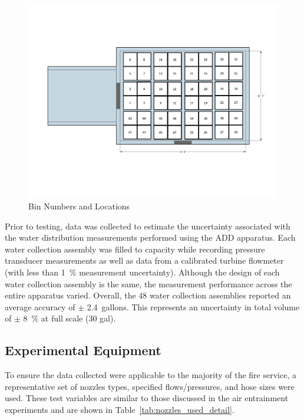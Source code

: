 \documentclass{book}
\begin{document}
\begin{figure}[!ht]
	\centering
	\includegraphics[width=\columnwidth]{Figures/Water_Distribution/Bin_Numbers_NoDimensions}
	\caption{Bin Numbers and Locations}
	\label{fig:Bin Numbers and Locations}
\end{figure}

Prior to testing, data was collected to estimate the uncertainty associated with the water distribution measurements performed using the ADD apparatus. Each water collection assembly was filled to capacity while recording pressure transducer measurements as well as data from a calibrated turbine flowmeter (with less than 1~\% measurement uncertainty). Although the design of each water collection assembly is the same, the measurement performance across the entire apparatus varied. Overall, the 48 water collection assemblies reported an average accuracy of $\pm$ 2.4~gallons. This represents an uncertainty in total volume of $\pm$ 8~\% at full scale (30 gal).

\subsection{Experimental Equipment}

To ensure the data collected were applicable to the majority of the fire service, a representative set of nozzles types, specified flows/pressures, and hose sizes were used. These test variables are similar to those discussed in the air entrainment experiments and are shown in Table~\ref{tab:nozzles_used_detail}.
\end{document}
